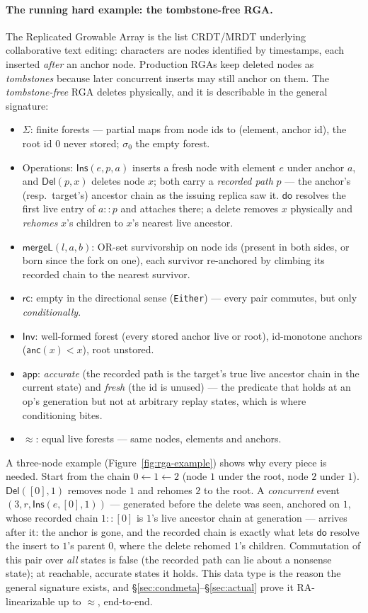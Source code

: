 \documentclass[11pt]{article}
\newcommand{\mergeL}{\mathsf{mergeL}}
\newcommand{\Sinit}{\sigma_0}
\newcommand{\lean}[1]{\texttt{#1}}
\newcommand{\anc}{\mathsf{anc}}
\newcommand{\eqobs}{\approx}
\newcommand{\Inv}{\mathsf{Inv}}
\newcommand{\app}{\mathsf{app}}
\begin{document}
\paragraph{The running hard example: the tombstone-free RGA.} The
Replicated Growable Array is the list CRDT/MRDT underlying collaborative
text editing: characters are nodes identified by timestamps, each
inserted \emph{after} an anchor node. Production RGAs keep deleted nodes
as \emph{tombstones} because later concurrent inserts may still anchor on
them. The \emph{tombstone-free} RGA deletes physically, and it is
describable in the general signature:
\begin{itemize}[leftmargin=2em,nosep]
\item $\Sigma$: finite forests --- partial maps from node ids to
  (element, anchor id), the root id $0$ never stored; $\Sinit$ the empty
  forest.
\item Operations: $\mathsf{Ins}(e, p, a)$ inserts a fresh node with
  element $e$ under anchor $a$, and $\mathsf{Del}(p, x)$ deletes node
  $x$; both carry a \emph{recorded path} $p$ --- the anchor's (resp.\
  target's) ancestor chain as the issuing replica saw it. $\mathsf{do}$
  resolves the first live entry of $a :: p$ and attaches there; a delete
  removes $x$ physically and \emph{rehomes} $x$'s children to $x$'s
  nearest live ancestor.
\item $\mergeL(l,a,b)$: OR-set survivorship on node ids (present in both
  sides, or born since the fork on one), each survivor re-anchored by
  climbing its recorded chain to the nearest survivor.
\item $\mathsf{rc}$: empty in the directional sense (\lean{Either}) ---
  every pair commutes, but only \emph{conditionally}.
\item $\Inv$: well-formed forest (every stored anchor live or root),
  id-monotone anchors ($\anc(x) < x$), root unstored.
\item $\app$: \emph{accurate} (the recorded path is the target's true
  live ancestor chain in the current state) and \emph{fresh} (the id is
  unused) --- the predicate that holds at an op's generation but not at
  arbitrary replay states, which is where conditioning bites.
\item $\eqobs$: equal live forests --- same nodes, elements and anchors.
\end{itemize}
A three-node example (Figure~\ref{fig:rga-example}) shows why every
piece is needed. Start from the chain $0 \leftarrow 1 \leftarrow 2$ (node $1$ under the root, node $2$
under $1$). $\mathsf{Del}([0], 1)$ removes node $1$ and rehomes $2$ to
the root. A \emph{concurrent} event $(3, r, \mathsf{Ins}(e, [0], 1))$ ---
generated before the delete was seen, anchored on $1$, whose recorded
chain $1 :: [0]$ is $1$'s live ancestor chain at generation --- arrives
after it: the anchor is gone, and the recorded chain is exactly what lets
$\mathsf{do}$ resolve the insert to $1$'s parent $0$, where the delete
rehomed $1$'s children. Commutation of this pair over
\emph{all} states is false (the recorded path can lie about a nonsense
state); at reachable, accurate states it holds. This data type is the
reason the general signature exists, and
\S\ref{sec:condmeta}--\S\ref{sec:actual} prove it RA-linearizable up to
$\eqobs$, end-to-end.
\end{document}
